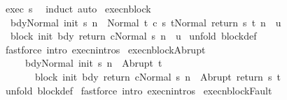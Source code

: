 \begin{isabellebody}
%
\endisadelimproof
%
\isatagproof
{}\isamarkupfalse%
\ exec\ s\ \isamarkupfalse%
\ {\isacharparenleft}induct{\isacharparenright}\ auto%
\endisatagproof
{\isafoldproof}%
%
\isadelimproof
\isanewline
%
\endisadelimproof
\isanewline
{}\isamarkupfalse%
\ execn{\isacharunderscore}block{\isacharcolon}\ \isanewline
\ \ {\isachardoublequoteopen}{\isasymlbrakk}{\isasymGamma}{\isasymturnstile}{\isasymlangle}bdy{\isacharcomma}Normal\ {\isacharparenleft}init\ s{\isacharparenright}{\isasymrangle}\ {\isacharequal}n{\isasymRightarrow}\ \ Normal\ t{\isacharsemicolon}\ {\isasymGamma}{\isasymturnstile}{\isasymlangle}c\ s\ t{\isacharcomma}Normal\ {\isacharparenleft}return\ s\ t{\isacharparenright}{\isasymrangle}\ {\isacharequal}n{\isasymRightarrow}\ \ u{\isasymrbrakk}\isanewline
\ \ {\isasymLongrightarrow}\ \isanewline
\ \ {\isasymGamma}{\isasymturnstile}{\isasymlangle}block\ init\ bdy\ return\ c{\isacharcomma}Normal\ s{\isasymrangle}\ {\isacharequal}n{\isasymRightarrow}\ \ u{\isachardoublequoteclose}\isanewline
%
\isadelimproof
%
\endisadelimproof
%
\isatagproof
{}\isamarkupfalse%
\ {\isacharparenleft}unfold\ block{\isacharunderscore}def{\isacharparenright}\isanewline
{}\isamarkupfalse%
\ {\isacharparenleft}fastforce\ intro{\isacharcolon}\ execn{\isachardot}intros{\isacharparenright}%
\endisatagproof
{\isafoldproof}%
%
\isadelimproof
\isanewline
%
\endisadelimproof
\isanewline
{}\isamarkupfalse%
\ execn{\isacharunderscore}blockAbrupt{\isacharcolon}\ \isanewline
\ \ \ \ \ {\isachardoublequoteopen}{\isasymlbrakk}{\isasymGamma}{\isasymturnstile}{\isasymlangle}bdy{\isacharcomma}Normal\ {\isacharparenleft}init\ s{\isacharparenright}{\isasymrangle}\ {\isacharequal}n{\isasymRightarrow}\ \ Abrupt\ t{\isasymrbrakk}\isanewline
\ \ \ \ \ \ \ {\isasymLongrightarrow}\ \isanewline
\ \ \ \ \ \ \ {\isasymGamma}{\isasymturnstile}{\isasymlangle}block\ init\ bdy\ return\ c{\isacharcomma}Normal\ s{\isasymrangle}\ {\isacharequal}n{\isasymRightarrow}\ \ Abrupt\ {\isacharparenleft}return\ s\ t{\isacharparenright}{\isachardoublequoteclose}\isanewline
%
\isadelimproof
%
\endisadelimproof
%
\isatagproof
{}\isamarkupfalse%
\ {\isacharparenleft}unfold\ block{\isacharunderscore}def{\isacharparenright}\isanewline
{}\isamarkupfalse%
\ {\isacharparenleft}fastforce\ intro{\isacharcolon}\ execn{\isachardot}intros{\isacharparenright}%
\endisatagproof
{\isafoldproof}%
%
\isadelimproof
\isanewline
%
\endisadelimproof
\isanewline
{}\isamarkupfalse%
\ execn{\isacharunderscore}blockFault{\isacharcolon}\ \isanewline

\end{isabellebody}
